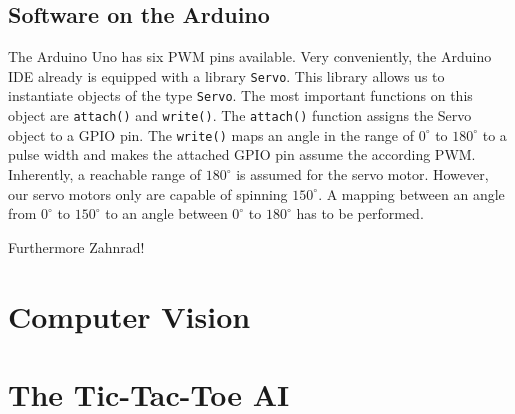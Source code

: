 \documentclass{sig-alternate-05-2015}
\begin{document}
\subsection{Software on the Arduino}
The Arduino Uno has six PWM pins available.
Very conveniently, the Arduino IDE already is equipped with a library \texttt{Servo}. This library allows us to instantiate objects of the type \texttt{Servo}. The most important functions on this object are \texttt{attach()} and \texttt{write()}. The \texttt{attach()} function assigns the Servo object to a GPIO pin. The \texttt{write()} maps an angle in the range of $0^\circ$ to $180^\circ$ to a pulse width and makes the attached GPIO pin assume the according PWM. Inherently, a reachable range of $180^\circ$ is assumed for the servo motor. However, our servo motors only are capable of spinning $150^\circ$. A mapping between an angle from $0^\circ$ to $150^\circ$ to an angle between $0^\circ$ to $180^\circ$ has to be performed.

Furthermore Zahnrad!
\section{Computer Vision}

\section{The Tic-Tac-Toe AI}

\newpage
\newpage
\newpage
\begin{abstract}
This paper provides a sample of a \LaTeX\ document which conforms,
somewhat loosely, to the formatting guidelines for
ACM SIG Proceedings. It is an {\em alternate} style which produces
a {\em tighter-looking} paper and was designed in response to
concerns expressed, by authors, over page-budgets.
It complements the document \textit{Author's (Alternate) Guide to
Preparing ACM SIG Proceedings Using \LaTeX$2_\epsilon$\ and Bib\TeX}.
This source file has been written with the intention of being
compiled under \LaTeX$2_\epsilon$\ and BibTeX.

The developers have tried to include every imaginable sort
of ``bells and whistles", such as a subtitle, footnotes on
title, subtitle and authors, as well as in the text, and
every optional component (e.g. Acknowledgments, Additional
Authors, Appendices), not to mention examples of
equations, theorems, tables and figures.

To make best use of this sample document, run it through \LaTeX\
and BibTeX, and compare this source code with the printed
output produced by the dvi file. A compiled PDF version
is available on the web page to help you with the
`look and feel'.
\end{abstract}
\end{document}
